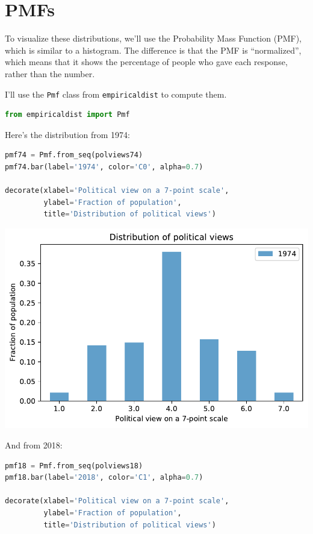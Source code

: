 \hypertarget{pmfs}{%
\section{PMFs}\label{pmfs}}

To visualize these distributions, we'll use the Probability Mass
Function (PMF), which is similar to a histogram. The difference is that
the PMF is ``normalized'', which means that it shows the percentage of
people who gave each response, rather than the number.

I'll use the \passthrough{\lstinline!Pmf!} class from
\passthrough{\lstinline!empiricaldist!} to compute them.

\begin{lstlisting}[language=Python]
from empiricaldist import Pmf
\end{lstlisting}

Here's the distribution from 1974:

\begin{lstlisting}[language=Python]
pmf74 = Pmf.from_seq(polviews74)
pmf74.bar(label='1974', color='C0', alpha=0.7)

decorate(xlabel='Political view on a 7-point scale',
         ylabel='Fraction of population',
         title='Distribution of political views')
\end{lstlisting}

\begin{center}
\includegraphics[scale=0.75]{02_polviews_files/02_polviews_30_0.pdf}
\end{center}

And from 2018:

\begin{lstlisting}[language=Python]
pmf18 = Pmf.from_seq(polviews18)
pmf18.bar(label='2018', color='C1', alpha=0.7)

decorate(xlabel='Political view on a 7-point scale',
         ylabel='Fraction of population',
         title='Distribution of political views')
\end{lstlisting}


